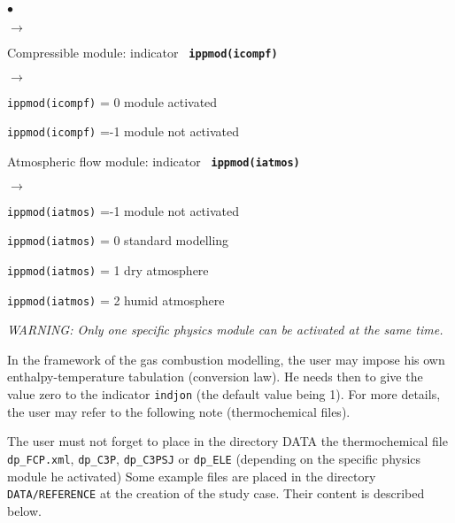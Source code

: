 {{{\begin{list}{$\bullet$}{}
\begin{list}{$\rightarrow$}{}
         \end{list}
       \item Compressible module: indicator {\bf \tt
             ippmod(icompf)}
        \begin{list}{$\rightarrow$}{}
               \item \texttt{ippmod(icompf)} = 0 module activated
               \item \texttt{ippmod(icompf)} =-1 module not activated
         \end{list}
       \item Atmospheric flow module: indicator {\bf \tt
             ippmod(iatmos)}
        \begin{list}{$\rightarrow$}{}
               \item \texttt{ippmod(iatmos)} =-1 module not activated
               \item \texttt{ippmod(iatmos)} = 0 standard modelling
               \item \texttt{ippmod(iatmos)} = 1 dry atmosphere
               \item \texttt{ippmod(iatmos)} = 2 humid atmosphere
         \end{list}
\end{list}

{\em WARNING: Only one specific physics module can be activated at the
same time.}

In the framework of the gas combustion modelling, the user may impose
his own enthalpy-temperature tabulation (conversion law). He needs then
to give the
value zero to the indicator \texttt{indjon} (the default value
being 1). For more details, the user may refer to the following note
(thermochemical files).

The user must not forget to place in the directory DATA the
thermochemical file \texttt{dp\_FCP.xml}, \texttt{dp\_C3P}, \texttt{dp\_C3PSJ} or
\texttt{dp\_ELE} (depending on the specific physics module he activated)
Some example files are placed in the directory \texttt{DATA/REFERENCE} at the creation of the
study case. Their content is described below.

}}}
